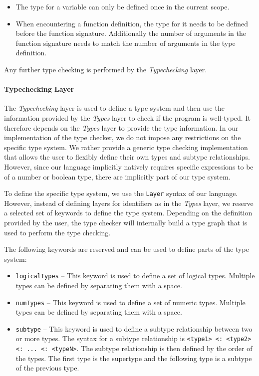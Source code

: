 \begin{itemize}
	\item The type for a variable can only be defined once in the current scope.
	\item When encountering a function definition, the type for it needs to be defined before the function signature. Additionally the number of arguments in the function signature needs to match the number of arguments in the type definition.
\end{itemize}

Any further type checking is performed by the \textit{Typechecking} layer.

\paragraph{Typechecking Layer}

The \textit{Typechecking} layer is used to define a type system and then use the information provided by the \textit{Types} layer to check if the program is well-typed. It therefore depends on the \textit{Types} layer to provide the type information. In our implementation of the type checker, we do not impose any restrictions on the specific type system. We rather provide a generic type checking implementation that allows the user to flexibly define their own types and subtype relationships. However, since our language implicitly natively requires specific expressions to be of a number or boolean type, there are implicitly part of our type system.

To define the specific type system, we use the \texttt{Layer} syntax of our language. However, instead of defining layers for identifiers as in the \textit{Types} layer, we reserve a selected set of keywords to define the type system. Depending on the definition provided by the user, the type checker will internally build a type graph that is used to perform the type checking.

The following keywords are reserved and can be used to define parts of the type system:

\begin{itemize}
	\item \texttt{logicalTypes} -- This keyword is used to define a set of logical types. Multiple types can be defined by separating them with a space.
	\item \texttt{numTypes} -- This keyword is used to define a set of numeric types. Multiple types can be defined by separating them with a space.
	\item \texttt{subtype} -- This keyword is used to define a subtype relationship between two or more types. The syntax for a subtype relationship is \texttt{<type1> <: <type2> <: ... <: <typeN>}. The subtype relationship is then defined by the order of the types. The first type is the supertype and the following type is a subtype of the previous type.
\end{itemize}

